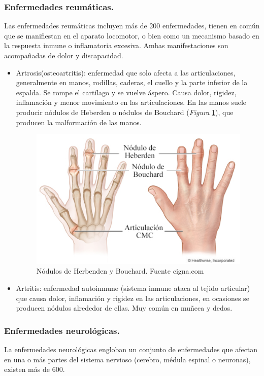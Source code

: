 \subsubsection{Enfermedades reumáticas.}
Las enfermedades reumáticas incluyen más de 200 enfermedades, tienen en común que se manifiestan en el aparato locomotor, o bien como un mecanismo basado en la respuesta inmune o inflamatoria excesiva. Ambas manifestaciones son acompañadas de dolor y discapacidad. 
\cite{enfermedades_Reumáticas}
\begin{itemize}
    \item Artrosis(osteoartritis): enfermedad que solo afecta a las articulaciones, generalmente en manos, rodillas, caderas, el cuello y la parte inferior de la espalda. Se rompe el cartílago y se vuelve áspero. Causa dolor, rigidez, inflamación y menor movimiento en las articulaciones. En las manos suele producir nódulos de Heberden o nódulos de Bouchard (\textit{Figura} \ref{fig:Nódulos}), que producen la malformación de las manos. \cite{osteoartritis}
\cite{nodulos}
    \begin{figure}
        \centering
        \includegraphics[width=0.75\linewidth]{img/Nodulos.png}
        \caption{Nódulos de Herbenden y Bouchard. Fuente cigna.com}
        \label{fig:Nódulos}
    \end{figure}
    \item Artritis: enfermedad autoinmune (sistema inmune ataca al tejido articular) que causa dolor, inflamación y rigidez en las articulaciones, en ocasiones se producen nódulos alrededor de ellas. 
    Muy común en muñeca y dedos. \cite{artritis}
\end{itemize}

\subsubsection{Enfermedades neurológicas.}
La enfermedades neurológicas engloban un conjunto de enfermedades que afectan en una o más partes del sistema nervioso (cerebro, médula espinal o neuronas), existen más de 600. 

